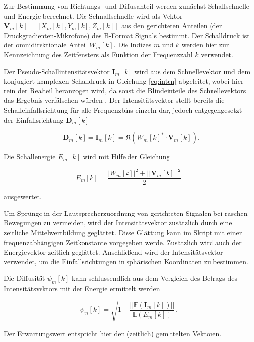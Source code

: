 Zur Bestimmung von Richtungs- und Diffusanteil werden zunächst Schallschnelle und Energie berechnet. Die Schnallschnelle wird als Vektor $\textbf{V}_{m}[k] = [X_{m}[k], Y_{m}[k], Z_{m}[k]]$ aus den gerichteten Anteilen (der Druckgradienten-Mikrofone) des B-Format Signals bestimmt. Der Schalldruck ist der omnidirektionale Anteil $W_{m}[k]$. Die Indizes $m$ und $k$ werden hier zur Kennzeichnung des Zeitfensters als Funktion der Frequenzzahl $k$ verwendet.

Der Pseudo-Schallintensitätsvektor $\textbf{I}_{m}[k]$ wird aus dem Schnellevektor und dem konjugiert komplexen Schalldruck in Gleichung \ref{eq:inten} abgeleitet, wobei hier rein der Realteil heranzogen wird, da sonst die Blindeinteile des Schnellevektors das Ergebnis verfälschen würden \cite{pulkki}. Der Intensitätsvektor stellt bereits die Schalleinfallsrichtung für alle Frequenzbins einzeln dar, jedoch entgegengesetzt der Einfallsrichtung $\textbf{D}_{m}[k]$

\begin{equation}
    -\textbf{D}_{m}[k] = \textbf{I}_{m}[k] = \Re(W_{m}[k]^{*} \cdot \textbf{V}_{m}[k]) .
    \label{eq:inten}
\end{equation}

Die Schallenergie $E_{m}[k]$ wird mit Hilfe der Gleichung

\begin{equation}
    E_{m}[k] = \frac{|W_{m}[k]|^2+||\textbf{V}_{m}[k]||^2}{2}
    \label{eq:energy}
\end{equation}

ausgewertet.

Um Sprünge in der Lautsprecherzuordnung von gerichteten Signalen bei raschen Bewegungen zu vermeiden, wird der Intensitätsvektor zusätzlich durch eine zeitliche Mittelwertbildung geglättet. Diese Glättung kann im Skript mit einer frequenzabhängigen Zeitkonstante vorgegeben werde. Zusätzlich wird auch der Energievektor zeitlich geglättet. Anschließend wird der Intensitätsvektor verwendet, um die Einfallsrichtungen in sphärischen Koordinaten zu bestimmen.

Die Diffusität $\psi_{m}[k]$ kann schlussendlich aus dem Vergleich des Betrags des Intensitätsvektors mit der Energie ermittelt werden

\begin{equation}
    \psi_{m}[k] = \sqrt{1 - \frac{||\mathbb{E}(\textbf{I}_{m}[k])||}{\mathbb{E}(E_{m}[k])}} .
    \label{eq:diff}
\end{equation}

 Der Erwartungswert entspricht hier den (zeitlich) gemittelten Vektoren.

